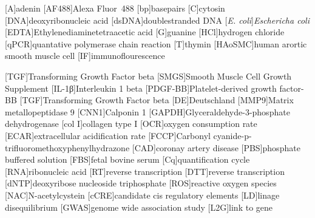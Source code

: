 \begin{acronym}
[A]{adenin}
[AF488]{Alexa Fluor\textsuperscript{\textregistered}~488}
[bp]{basepairs}
[C]{cytosin}
[DNA]{deoxyribonucleic acid}
[dsDNA]{doublestranded DNA}
[\textit{E. coli}]{\textit{Eschericha coli}}
[EDTA]{Ethylenediaminetetraacetic acid}
[G]{guanine}
[HCl]{hydrogen chloride}
[qPCR]{quantative polymerase chain reaction}
[T]{thymin}
[HAoSMC]{human arortic smooth muscle cell}
[IF]{immunoflourescence}


[TGF\beta]{Transforming Growth Factor beta}
[SMGS]{Smooth Muscle Cell Growth Supplement}
[IL-1β]{Interleukin 1 beta}
[PDGF-BB]{Platelet-derived growth factor-BB}
[TGF\beta]{Transforming Growth Factor beta}
[DE]{Deutschland}
[MMP9]{Matrix metallopeptidase 9}
[CNN1]{Calponin 1}
[GAPDH]{Glyceraldehyde-3-phosphate dehydrogenase}
[col I]{collagen type I}
[OCR]{oxygen consumption rate}
[ECAR]{extracellular acidification rate}
[FCCP]{Carbonyl cyanide-p-trifluoromethoxyphenylhydrazone}
[CAD]{coronay artery disease}
[PBS]{phosphate buffered solution}
[FBS]{fetal bovine serum}
[Cq]{quantification cycle}
[RNA]{ribonucleic acid}
[RT]{reverse transcription}
[DTT]{reverse transcription}
[dNTP]{deoxyribose nucleoside triphosphate}
[ROS]{reactive oxygen species}
[NAC]{N-acetylcystein}
[cCRE]{candidate cis regulatory elements}
[LD]{linage disequilibrium}
[GWAS]{genome wide association study}
[L2G]{link to gene}
\end{acronym}

